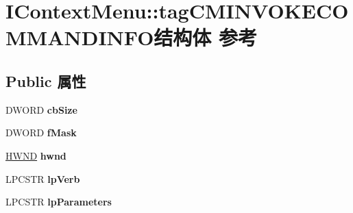 \hypertarget{struct_i_context_menu_1_1tag_c_m_i_n_v_o_k_e_c_o_m_m_a_n_d_i_n_f_o}{}\section{I\+Context\+Menu\+:\+:tag\+C\+M\+I\+N\+V\+O\+K\+E\+C\+O\+M\+M\+A\+N\+D\+I\+N\+F\+O结构体 参考}
\label{struct_i_context_menu_1_1tag_c_m_i_n_v_o_k_e_c_o_m_m_a_n_d_i_n_f_o}
\subsection*{Public 属性}
\begin{DoxyCompactItemize}
\item 
\mbox{\label{struct_i_context_menu_1_1tag_c_m_i_n_v_o_k_e_c_o_m_m_a_n_d_i_n_f_o_a408cd6d26dcfc5935e0c8b85818b8919}} 
D\+W\+O\+RD {\bfseries cb\+Size}
\item 
\mbox{\label{struct_i_context_menu_1_1tag_c_m_i_n_v_o_k_e_c_o_m_m_a_n_d_i_n_f_o_a8b131dda92ae27bab02ea1e31954afa9}} 
D\+W\+O\+RD {\bfseries f\+Mask}
\item 
\mbox{\label{struct_i_context_menu_1_1tag_c_m_i_n_v_o_k_e_c_o_m_m_a_n_d_i_n_f_o_adab4f79d6e479d622146cb49ab236e28}} 
\hyperlink{interfacevoid}{H\+W\+ND} {\bfseries hwnd}
\item 
\mbox{\label{struct_i_context_menu_1_1tag_c_m_i_n_v_o_k_e_c_o_m_m_a_n_d_i_n_f_o_a308f3b4a7576729bee0b70fe8ad40cfa}} 
L\+P\+C\+S\+TR {\bfseries lp\+Verb}
\item 
\mbox{\label{struct_i_context_menu_1_1tag_c_m_i_n_v_o_k_e_c_o_m_m_a_n_d_i_n_f_o_aee2eeb60d29d6021a23623b765cdcab4}} 
L\+P\+C\+S\+TR {\bfseries lp\+Parameters}
\item 
\mbox{\label{struct_i_context_menu_1_1tag_c_m_i_n_v_o_k_e_c_o_m_m_a_n_d_i_n_f_o_ad0fa70a22a5d9300e6c1d2ad9e6035d7}} 

\end{DoxyCompactItemize}
